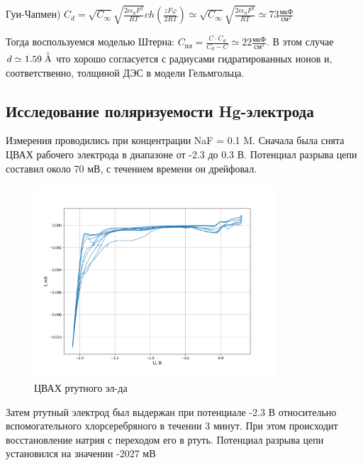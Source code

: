 \documentclass[a4paper, 12pt]{article}
\begin{document}
Гуи-Чапмен) $C_d = \sqrt{C_\infty} \sqrt{\frac{2\epsilon \epsilon_0 F^2}{RT}} ch\left( \frac{zF\varphi}{2RT} \right) \simeq \sqrt{C_\infty} \sqrt{\frac{2\epsilon \epsilon_0 F^2}{RT}} \simeq 73 \frac{\text{мкФ}}{\text{см}^2}$

Тогда воспользуемся моделью Штерна: $C_\text{пл} = \frac{C \cdot C_d}{C_d - C} \simeq 22 \frac{\text{мкФ}}{\text{см}^2}$. В этом случае $d \simeq 1.59 \buildrel _\circ \over {\mathrm{A}}$ что хорошо согласуется с радиусами гидратированных ионов и, соответственно, толщиной ДЭС в модели Гельмгольца.














\subsection{Исследование поляризуемости Hg-электрода}
Измерения проводились при концентрации NaF = 0.1 M. Сначала была снята ЦВАХ рабочего электрода в диапазоне от -2.3 до 0.3 В. Потенциал разрыва цепи составил около 70 мВ, с течением времени он дрейфовал.
\begin{figure}[h!]
    \begin{center}
    \includegraphics[width=0.8\textwidth]{A.png}
    \end{center}
    \caption{ЦВАХ ртутного эл-да}
\end{figure}

Затем ртутный электрод был выдержан при потенциале -2.3 В относительно вспомогательного хлорсеребряного в течении 3 минут. При этом происходит восстановление натрия с переходом его в ртуть. Потенциал разрыва цепи установился на значении -2027 мВ
\end{document}
